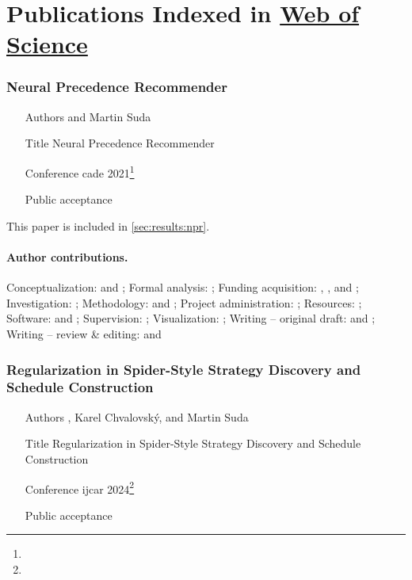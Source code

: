 \section{Publications Indexed in \href{https://www.webofscience.com/}{Web of Science}}
\label{sec:wos}

\subsubsection{Neural Precedence Recommender}

\begin{itemize}
\item[Authors]  and Martin Suda
\item[Title] Neural Precedence Recommender \cite{DBLP:conf/cade/Bartek021}
\item[Conference] \Acrfull{cade} 2021\footnote{}
\item[Public acceptance] 
\end{itemize}

This paper is included in \cref{sec:results:npr}.

\paragraph{Author contributions.}
Conceptualization:            \MS{} and \FB{};
Formal analysis:              \FB{};
Funding acquisition:          \MS{}, \FB{}, and \JU{};
Investigation:                \FB{};
Methodology:                  \FB{} and \MS{};
Project administration:       \MS{};
Resources:                    \JU{};
Software:                     \FB{} and \MS{};
Supervision:                  \MS{};
Visualization:                \FB{};
Writing -- original draft:    \FB{} and \MS{};
Writing -- review \& editing: \FB{} and \MS{}

\subsubsection{Regularization in Spider-Style Strategy Discovery and Schedule Construction}

\begin{itemize}
\item[Authors] , Karel Chvalovský, and Martin Suda
\item[Title] Regularization in Spider-Style Strategy Discovery and Schedule Construction \cite{DBLP:conf/ijcar/BartekCS24}
\item[Conference] \Acrfull{ijcar} 2024\footnote{}
\item[Public acceptance] 
\end{itemize}

